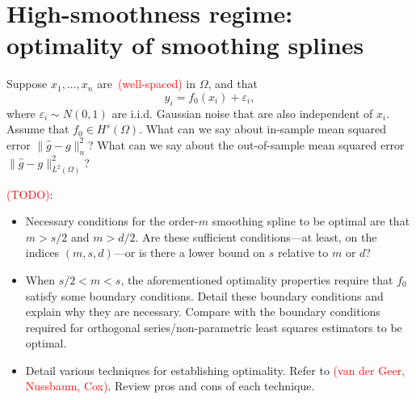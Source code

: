 \documentclass{article}
\newcommand{\1}{\mathbf{1}}
\newcommand{\wh}[1]{\widehat{#1}}
\theoremstyle{alden}
\theoremstyle{aldenthm}
\theoremstyle{definition}
\theoremstyle{remark}
\begin{document}
\section{High-smoothness regime: optimality of smoothing splines}
Suppose $x_1,\ldots,x_n$ are~\textcolor{red}{(well-spaced)} in $\Omega$, and that
\begin{equation}
\label{model:regression}
y_i = f_0(x_i) + \varepsilon_i,
\end{equation}
where $\varepsilon_i \sim N(0,1)$ are i.i.d. Gaussian noise that are also independent of $x_i$. Assume that $f_0 \in H^s(\Omega)$. What can we say about in-sample mean squared error $\|\wh{g} - g\|_n^2$? What can we say about the out-of-sample mean squared error $\|\wh{g} - g\|_{L^2(\Omega)}^2$?

\textcolor{red}{(TODO)}:
\begin{itemize}
	\item Necessary conditions for the order-$m$ smoothing spline to be optimal are that $m > s/2$ and $m > d/2$. Are these sufficient conditions---at least, on the indices $(m,s,d)$---or is there a lower bound on $s$ relative to $m$ or $d$?
	\item When $s/2 < m < s$, the aforementioned optimality properties require that $f_0$ satisfy some boundary conditions. Detail these boundary conditions and explain why they are necessary. Compare with the boundary conditions required for orthogonal series/non-parametric least squares estimators to be optimal.
 	\item Detail various techniques for establishing optimality. Refer to \textcolor{red}{(van der Geer, Nussbaum, Cox)}. Review pros and cons of each technique.
\end{itemize}
\end{document}
